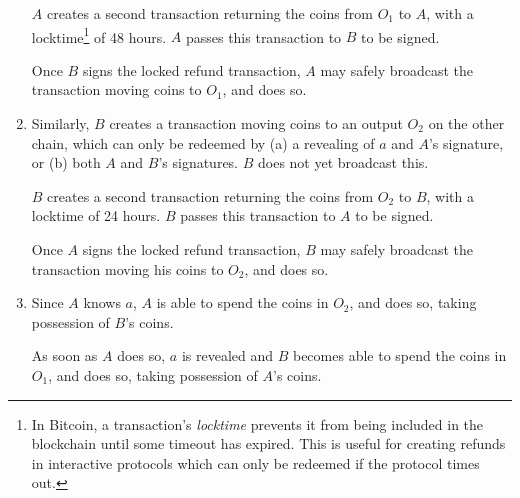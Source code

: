 \documentclass[letterpaper]{article}
\begin{document}
\begin{appendices}
\begin{enumerate}
$A$ creates a second transaction returning the coins from $O_1$ to $A$, with
a locktime\footnote{In Bitcoin, a transaction's \emph{locktime} prevents it from
being included in the blockchain until some timeout has expired. This is useful
for creating refunds in interactive protocols which can only be redeemed if the
protocol times out.} of 48 hours. $A$ passes this transaction to $B$ to be
signed.

Once $B$ signs the locked refund transaction, $A$ may safely broadcast the
transaction moving coins to $O_1$, and does so.

\item Similarly, $B$ creates a transaction moving coins to an output $O_2$
on the other chain, which can only be redeemed by (a) a revealing of $a$ and $A$'s
signature, or (b) both $A$ and $B$'s signatures. $B$ does not yet broadcast this.

$B$ creates a second transaction returning the coins from $O_2$ to $B$, with
a locktime of 24 hours. $B$ passes this transaction to $A$ to be signed.

Once $A$ signs the locked refund transaction, $B$ may safely broadcast the
transaction moving his coins to $O_2$, and does so.

\item Since $A$ knows $a$, $A$ is able to spend the coins in $O_2$, and does
so, taking possession of $B$'s coins.

As soon as $A$ does so, $a$ is revealed and $B$ becomes able to spend the
coins in $O_1$, and does so, taking possession of $A$'s coins.
\end{enumerate}

\end{appendices}

\nolinenumbers

\clearpage


\end{document}
